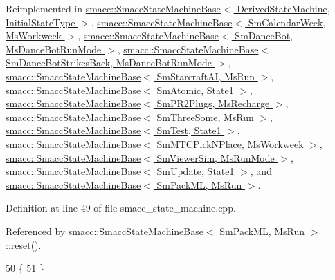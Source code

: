 Reimplemented in \hyperlink{structsmacc_1_1SmaccStateMachineBase_af34aec9fa012f0e3858131c84abfd5ed}{smacc\+::\+Smacc\+State\+Machine\+Base$<$ Derived\+State\+Machine, Initial\+State\+Type $>$}, \hyperlink{structsmacc_1_1SmaccStateMachineBase_af34aec9fa012f0e3858131c84abfd5ed}{smacc\+::\+Smacc\+State\+Machine\+Base$<$ Sm\+Calendar\+Week, Ms\+Workweek $>$}, \hyperlink{structsmacc_1_1SmaccStateMachineBase_af34aec9fa012f0e3858131c84abfd5ed}{smacc\+::\+Smacc\+State\+Machine\+Base$<$ Sm\+Dance\+Bot, Ms\+Dance\+Bot\+Run\+Mode $>$}, \hyperlink{structsmacc_1_1SmaccStateMachineBase_af34aec9fa012f0e3858131c84abfd5ed}{smacc\+::\+Smacc\+State\+Machine\+Base$<$ Sm\+Dance\+Bot\+Strikes\+Back, Ms\+Dance\+Bot\+Run\+Mode $>$}, \hyperlink{structsmacc_1_1SmaccStateMachineBase_af34aec9fa012f0e3858131c84abfd5ed}{smacc\+::\+Smacc\+State\+Machine\+Base$<$ Sm\+Starcraft\+A\+I, Ms\+Run $>$}, \hyperlink{structsmacc_1_1SmaccStateMachineBase_af34aec9fa012f0e3858131c84abfd5ed}{smacc\+::\+Smacc\+State\+Machine\+Base$<$ Sm\+Atomic, State1 $>$}, \hyperlink{structsmacc_1_1SmaccStateMachineBase_af34aec9fa012f0e3858131c84abfd5ed}{smacc\+::\+Smacc\+State\+Machine\+Base$<$ Sm\+P\+R2\+Plugs, Ms\+Recharge $>$}, \hyperlink{structsmacc_1_1SmaccStateMachineBase_af34aec9fa012f0e3858131c84abfd5ed}{smacc\+::\+Smacc\+State\+Machine\+Base$<$ Sm\+Three\+Some, Ms\+Run $>$}, \hyperlink{structsmacc_1_1SmaccStateMachineBase_af34aec9fa012f0e3858131c84abfd5ed}{smacc\+::\+Smacc\+State\+Machine\+Base$<$ Sm\+Test, State1 $>$}, \hyperlink{structsmacc_1_1SmaccStateMachineBase_af34aec9fa012f0e3858131c84abfd5ed}{smacc\+::\+Smacc\+State\+Machine\+Base$<$ Sm\+M\+T\+C\+Pick\+N\+Place, Ms\+Workweek $>$}, \hyperlink{structsmacc_1_1SmaccStateMachineBase_af34aec9fa012f0e3858131c84abfd5ed}{smacc\+::\+Smacc\+State\+Machine\+Base$<$ Sm\+Viewer\+Sim, Ms\+Run\+Mode $>$}, \hyperlink{structsmacc_1_1SmaccStateMachineBase_af34aec9fa012f0e3858131c84abfd5ed}{smacc\+::\+Smacc\+State\+Machine\+Base$<$ Sm\+Update, State1 $>$}, and \hyperlink{structsmacc_1_1SmaccStateMachineBase_af34aec9fa012f0e3858131c84abfd5ed}{smacc\+::\+Smacc\+State\+Machine\+Base$<$ Sm\+Pack\+M\+L, Ms\+Run $>$}.



Definition at line 49 of file smacc\+\_\+state\+\_\+machine.\+cpp.



Referenced by smacc\+::\+Smacc\+State\+Machine\+Base$<$ Sm\+Pack\+M\+L, Ms\+Run $>$\+::reset().


\begin{DoxyCode}
50 \{
51 \}
\end{DoxyCode}


